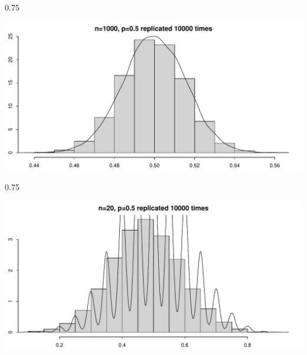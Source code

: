 \documentclass{beamer}\usepackage[]{graphicx}\usepackage[]{color}
\newenvironment{knitrout}{}{} %
\renewenvironment{knitrout}{\begin{spacing}{0.75}\begin{tiny}}{\end{tiny}\end{spacing}}
\begin{document}
\begin{frame}[fragile]

\begin{knitrout}\small
{}\color{fgcolor}

{\centering \includegraphics[width=0.89\linewidth]{figure/graphics-unnamed-chunk-19-1} 

}



\end{knitrout}

\end{frame}


\begin{frame}[fragile]

\begin{knitrout}\small
{}\color{fgcolor}

{\centering \includegraphics[width=0.89\linewidth]{figure/graphics-unnamed-chunk-20-1} 

}



\end{knitrout}

\end{frame}
\end{document}
